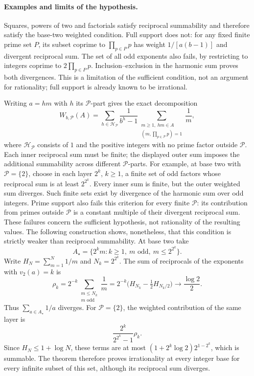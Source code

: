 \documentclass[11pt]{article}
\theoremstyle{plain}
\theoremstyle{definition}
\theoremstyle{remark}
\providecommand{\m}[1]{\ensuremath{#1}}
\begin{document}
\paragraph{Examples and limits of the hypothesis.}
Squares, powers of two and factorials satisfy reciprocal summability and
therefore satisfy the base-two weighted condition.  Full support does not:
for any fixed finite prime set $P$, its subset coprime to $\prod_{p\in P}p$
has weight $1/[a(b-1)]$ and divergent reciprocal sum.  The set of all odd
exponents also fails, by restricting to integers coprime to
$2\prod_{p\in P}p$.  Inclusion--exclusion in the harmonic sum proves both
divergences.  This is a limitation of the sufficient condition, not an
argument for rationality; full support is already known to be irrational.

Writing $a=hm$ with $h$ its $\mathcal P$-part gives the exact decomposition
\[
 W_{b,\mathcal P}(A)=\sum_{h\in\mathcal H_{\mathcal P}}\frac1{b^h-1}
       \sum_{\substack{m\ge1,\ hm\in A\\(m,\prod_{p\in\mathcal P}p)=1}}\frac1m,
\]
where $\mathcal H_{\mathcal P}$ consists of $1$ and the positive
integers with no prime factor outside $\mathcal P$.  Each inner
reciprocal sum must be finite; the displayed outer sum imposes the
additional summability across different $\mathcal P$-parts.
For example, at base two with $\mathcal P=\{2\}$, choose in each layer
$2^k$, $k\ge1$, a finite set of odd factors whose reciprocal
sum is at least $2^{2^k}$.  Every inner sum is finite, but the
outer weighted sum diverges.  Such finite sets exist by divergence
of the harmonic sum over odd integers.  Prime support also fails
this criterion for every finite $\mathcal P$: its contribution
from primes outside $\mathcal P$ is a constant multiple of their
divergent reciprocal sum.  These failures concern the sufficient
hypothesis, not rationality of the resulting values.
The following construction shows, nonetheless, that this condition
is strictly weaker than reciprocal summability.
At base two take
\[
 A_\star=\{2^k m:k\ge1,\ m\text{ odd},\ m\le2^{2^k}\}.
\]
Write $H_N=\sum_{m=1}^N1/m$ and $N_k=2^{2^k}$. The sum of reciprocals
of the exponents with $v_2(a)=k$ is
\[
 \rho_k=2^{-k}\!\sum_{\substack{m\le N_k\\m\text{ odd}}}\frac1m
 =2^{-k}\bigl(H_{N_k}-\tfrac12H_{N_k/2}\bigr)
 \longrightarrow\frac{\log2}{2}.
\]
Thus $\sum_{a\in A_\star}1/a$ diverges.  For $\mathcal P=\{2\}$,
the weighted contribution of the same layer is
\[
 \frac{2^k}{2^{2^k}-1}\rho_k.
\]
Since $H_N\le1+\log N$, these terms are at most
$(1+2^k\log2)2^{1-2^k}$, which is summable.  The theorem therefore proves
irrationality at every integer base for every infinite subset of this set,
although its reciprocal sum diverges.
\end{document}
